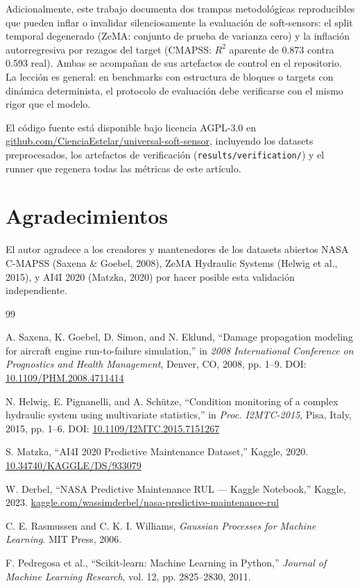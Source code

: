 \documentclass[10pt]{article}
\begin{document}
Adicionalmente, este trabajo documenta dos trampas metodológicas reproducibles que pueden inflar o invalidar silenciosamente la evaluación de soft-sensors: el split temporal degenerado (ZeMA: conjunto de prueba de varianza cero) y la inflación autorregresiva por rezagos del target (CMAPSS: $R^2$ aparente de 0.873 contra 0.593 real). Ambas se acompañan de sus artefactos de control en el repositorio. La lección es general: en benchmarks con estructura de bloques o targets con dinámica determinista, el protocolo de evaluación debe verificarse con el mismo rigor que el modelo.

El código fuente está disponible bajo licencia AGPL-3.0 en \href{https://github.com/CienciaEstelar/universal-soft-sensor}{github.com/CienciaEstelar/universal-soft-sensor}, incluyendo los datasets preprocesados, los artefactos de verificación (\texttt{results/verification/}) y el runner que regenera todas las métricas de este artículo.

\section*{Agradecimientos}
El autor agradece a los creadores y mantenedores de los datasets abiertos NASA C-MAPSS (Saxena \& Goebel, 2008), ZeMA Hydraulic Systems (Helwig et al., 2015), y AI4I 2020 (Matzka, 2020) por hacer posible esta validación independiente.

\begin{thebibliography}{99}

A. Saxena, K. Goebel, D. Simon, and N. Eklund,
``Damage propagation modeling for aircraft engine run-to-failure simulation,''
in \emph{2008 International Conference on Prognostics and Health Management}, Denver, CO, 2008, pp. 1--9.
DOI: \href{https://doi.org/10.1109/PHM.2008.4711414}{10.1109/PHM.2008.4711414}

N. Helwig, E. Pignanelli, and A. Schütze,
``Condition monitoring of a complex hydraulic system using multivariate statistics,''
in \emph{Proc. I2MTC-2015}, Pisa, Italy, 2015, pp. 1--6.
DOI: \href{https://doi.org/10.1109/I2MTC.2015.7151267}{10.1109/I2MTC.2015.7151267}

S. Matzka,
``AI4I 2020 Predictive Maintenance Dataset,''
Kaggle, 2020.
\href{https://doi.org/10.34740/KAGGLE/DS/933079}{10.34740/KAGGLE/DS/933079}

W. Derbel,
``NASA Predictive Maintenance RUL --- Kaggle Notebook,''
Kaggle, 2023.
\href{https://www.kaggle.com/code/wassimderbel/nasa-predictive-maintenance-rul}{kaggle.com/wassimderbel/nasa-predictive-maintenance-rul}

C. E. Rasmussen and C. K. I. Williams,
\emph{Gaussian Processes for Machine Learning}.
MIT Press, 2006.

F. Pedregosa et al.,
``Scikit-learn: Machine Learning in Python,''
\emph{Journal of Machine Learning Research}, vol. 12, pp. 2825--2830, 2011.

\end{thebibliography}
\end{document}
